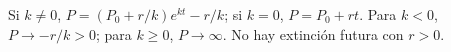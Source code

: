 Si $k\ne0$, $P=(P_0+r/k)e^{kt}-r/k$; si $k=0$, $P=P_0+rt$. Para $k<0$, $P\to-r/k>0$; para $k\ge0$, $P\to\infty$. No hay extinción futura con $r>0$.
